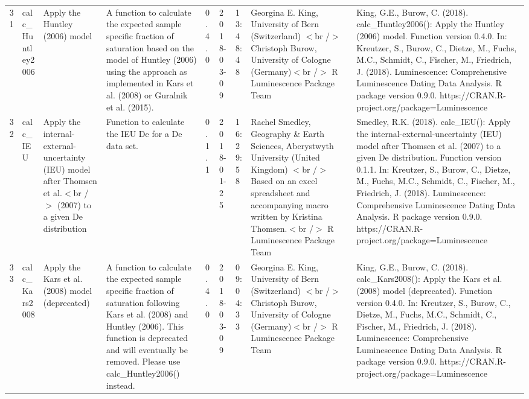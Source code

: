 \begin{table}[ht]
\begin{tabular}{rllllllll}
 \\ 
  31 & calc\_Huntley2006 & Apply the Huntley (2006) model & A function to calculate the expected sample specific fraction of saturation based on the model of Huntley (2006) using the approach as implemented in Kars et al. (2008) or Guralnik et al. (2015). & 0.4.0 & 2018-03-09 & 13:48:48
 & Georgina E. King, University of Bern (Switzerland)  $<$br /$>$ Christoph Burow, University of Cologne (Germany)$<$br /$>$  R Luminescence Package Team & King, G.E., Burow, C. (2018). calc\_Huntley2006(): Apply the Huntley (2006) model. Function version 0.4.0. In: Kreutzer, S., Burow, C., Dietze, M., Fuchs, M.C., Schmidt, C., Fischer, M., Friedrich, J. (2018). Luminescence: Comprehensive Luminescence Dating Data Analysis. R package version 0.9.0. https://CRAN.R-project.org/package=Luminescence
 \\ 
  32 & calc\_IEU & Apply the internal-external-uncertainty (IEU) model after Thomsen et al.$<$br /$>$ (2007) to a given De distribution & Function to calculate the IEU De for a De data set. & 0.1.1 & 2018-01-25 & 16:29:58
 & Rachel Smedley, Geography \& Earth Sciences, Aberystwyth University (United Kingdom)  $<$br /$>$ Based on an excel spreadsheet and accompanying macro written by Kristina Thomsen.$<$br /$>$  R Luminescence Package Team & Smedley, R.K. (2018). calc\_IEU(): Apply the internal-external-uncertainty (IEU) model after Thomsen et al. (2007) to a given De distribution. Function version 0.1.1. In: Kreutzer, S., Burow, C., Dietze, M., Fuchs, M.C., Schmidt, C., Fischer, M., Friedrich, J. (2018). Luminescence: Comprehensive Luminescence Dating Data Analysis. R package version 0.9.0. https://CRAN.R-project.org/package=Luminescence
 \\ 
  33 & calc\_Kars2008 & Apply the Kars et al. (2008) model (deprecated) & A function to calculate the expected sample specific fraction of saturation following Kars et al. (2008) and Huntley (2006). This function is deprecated and will eventually be removed. Please use  calc\_Huntley2006()  instead. & 0.4.0 & 2018-03-09 & 09:04:33
 & Georgina E. King, University of Bern (Switzerland)  $<$br /$>$ Christoph Burow, University of Cologne (Germany)$<$br /$>$  R Luminescence Package Team & King, G.E., Burow, C. (2018). calc\_Kars2008(): Apply the Kars et al. (2008) model (deprecated). Function version 0.4.0. In: Kreutzer, S., Burow, C., Dietze, M., Fuchs, M.C., Schmidt, C., Fischer, M., Friedrich, J. (2018). Luminescence: Comprehensive Luminescence Dating Data Analysis. R package version 0.9.0. https://CRAN.R-project.org/package=Luminescence

\end{tabular}
\end{table}
